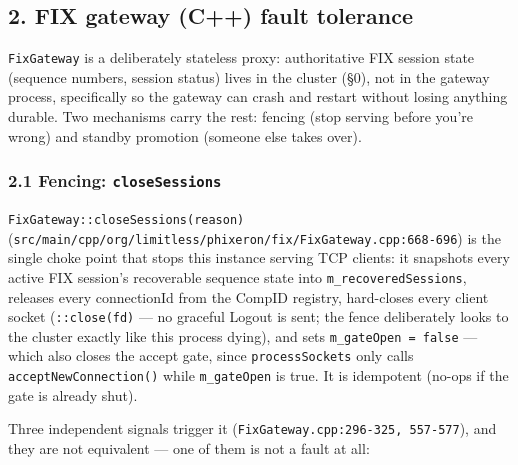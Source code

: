\documentclass[
  10pt,
]{article}
\begin{document}
\subsection{2. FIX gateway (C++) fault
tolerance}\label{fix-gateway-c-fault-tolerance}

\texttt{FixGateway} is a deliberately stateless proxy: authoritative FIX
session state (sequence numbers, session status) lives in the cluster
(§0), not in the gateway process, specifically so the gateway can crash
and restart without losing anything durable. Two mechanisms carry the
rest: fencing (stop serving before you're wrong) and standby promotion
(someone else takes over).

\subsubsection{\texorpdfstring{2.1 Fencing:
\texttt{closeSessions}}{2.1 Fencing: closeSessions}}\label{fencing-closesessions}

\texttt{FixGateway::closeSessions(reason)}
(\texttt{src/main/cpp/org/limitless/phixeron/fix/FixGateway.cpp:668-696})
is the single choke point that stops this instance serving TCP clients:
it snapshots every active FIX session's recoverable sequence state into
\texttt{m\_recoveredSessions}, releases every connectionId from the
CompID registry, hard-closes every client socket (\texttt{::close(fd)}
--- no graceful Logout is sent; the fence deliberately looks to the
cluster exactly like this process dying), and sets
\texttt{m\_gateOpen\ =\ false} --- which also closes the accept gate,
since \texttt{processSockets} only calls \texttt{acceptNewConnection()}
while \texttt{m\_gateOpen} is true. It is idempotent (no-ops if the gate
is already shut).

Three independent signals trigger it
(\texttt{FixGateway.cpp:296-325,\ 557-577}), and they are not equivalent
--- one of them is not a fault at all:
\end{document}
